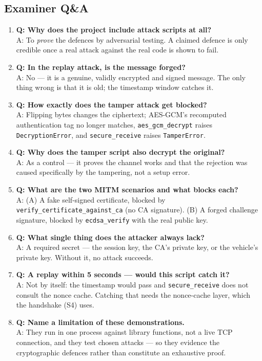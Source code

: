 \documentclass[11pt,a4paper]{report}
\begin{document}
\subsection{Examiner Q\&A}
\begin{enumerate}
  \item \textbf{Q: Why does the project include attack scripts at all?}\\
        A: To \emph{prove} the defences by adversarial testing. A claimed defence
        is only credible once a real attack against the real code is shown to
        fail.
  \item \textbf{Q: In the replay attack, is the message forged?}\\
        A: No --- it is a genuine, validly encrypted and signed message. The only
        thing wrong is that it is old; the timestamp window catches it.
  \item \textbf{Q: How exactly does the tamper attack get blocked?}\\
        A: Flipping bytes changes the ciphertext; AES-GCM's recomputed
        authentication tag no longer matches, \texttt{aes\_gcm\_decrypt} raises
        \texttt{DecryptionError}, and \texttt{secure\_receive} raises
        \texttt{TamperError}.
  \item \textbf{Q: Why does the tamper script also decrypt the original?}\\
        A: As a control --- it proves the channel works and that the rejection
        was caused specifically by the tampering, not a setup error.
  \item \textbf{Q: What are the two MITM scenarios and what blocks each?}\\
        A: (A) A fake self-signed certificate, blocked by
        \texttt{verify\_certificate\_against\_ca} (no CA signature). (B) A forged
        challenge signature, blocked by \texttt{ecdsa\_verify} with the real
        public key.
  \item \textbf{Q: What single thing does the attacker always lack?}\\
        A: A required secret --- the session key, the CA's private key, or the
        vehicle's private key. Without it, no attack succeeds.
  \item \textbf{Q: A replay within 5 seconds --- would this script catch it?}\\
        A: Not by itself: the timestamp would pass and \texttt{secure\_receive}
        does not consult the nonce cache. Catching that needs the nonce-cache
        layer, which the handshake (S4) uses.
  \item \textbf{Q: Name a limitation of these demonstrations.}\\
        A: They run in one process against library functions, not a live TCP
        connection, and they test chosen attacks --- so they evidence the
        cryptographic defences rather than constitute an exhaustive proof.
\end{enumerate}
\end{document}
